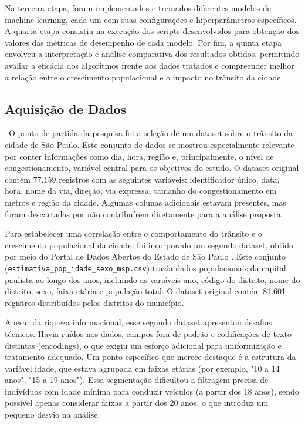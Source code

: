 \documentclass[conference]{IEEEtran}
\begin{document}
Na terceira etapa, foram implementados e treinados diferentes modelos de machine learning, cada um com suas configurações e hiperparâmetros específicos. A quarta etapa consistiu na execução dos scripts desenvolvidos para obtenção dos valores das métricas de desempenho de cada modelo. Por fim, a quinta etapa envolveu a interpretação e análise comparativa dos resultados obtidos, permitindo avaliar a eficácia dos algoritmos frente aos dados tratados e compreender melhor a relação entre o crescimento populacional e o impacto no trânsito da cidade.

\subsection{Aquisição de Dados}\
O ponto de partida da pesquisa foi a seleção de um dataset sobre o trânsito da cidade de São Paulo. Este conjunto de dados se mostrou especialmente relevante por conter informações como dia, hora, região e, principalmente, o nível de congestionamento, variável central para os objetivos do estudo. O dataset original contém 77.159 registros com as seguintes variáveis: identificador único, data, hora, nome da via, direção, via expressa, tamanho do congestionamento em metros e região da cidade. Algumas colunas adicionais estavam presentes, mas foram descartadas por não contribuírem diretamente para a análise proposta.

Para estabelecer uma correlação entre o comportamento do trânsito e o crescimento populacional da cidade, foi incorporado um segundo dataset, obtido por meio do Portal de Dados Abertos do Estado de São Paulo \cite{8}. Este conjunto (\texttt{estimativa\_pop\_idade\_sexo\_msp.csv}) trazia dados populacionais da capital paulista ao longo dos anos, incluindo as variáveis ano, código do distrito, nome do distrito, sexo, faixa etária e população total. O dataset original contém 81.601 registros distribuídos pelos distritos do município.

Apesar da riqueza informacional, esse segundo dataset apresentou desafios técnicos. Havia ruídos nos dados, campos fora de padrão e codificações de texto distintas (encodings), o que exigiu um esforço adicional para uniformização e tratamento adequado. Um ponto específico que merece destaque é a estrutura da variável idade, que estava agrupada em faixas etárias (por exemplo, "10 a 14 anos", "15 a 19 anos"). Essa segmentação dificultou a filtragem precisa de indivíduos com idade mínima para conduzir veículos (a partir dos 18 anos), sendo possível apenas considerar faixas a partir dos 20 anos, o que introduz um pequeno desvio na análise.
\end{document}
